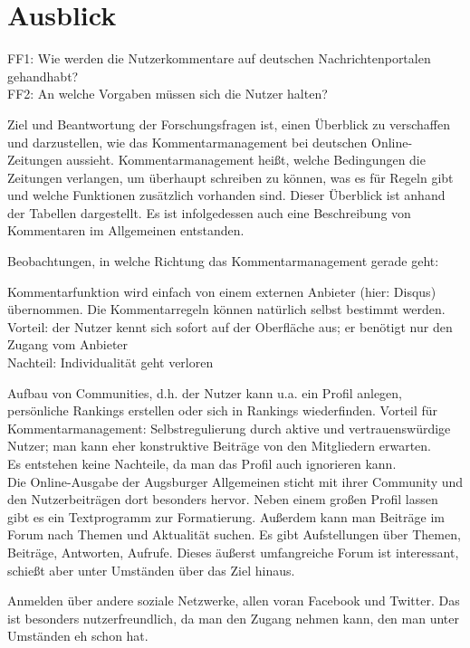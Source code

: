 \chapter{Ausblick}

FF1: Wie werden die Nutzerkommentare auf deutschen Nachrichtenportalen
gehandhabt?\\
FF2: An welche Vorgaben müssen sich die Nutzer halten?

Ziel und Beantwortung der Forschungsfragen ist, einen Überblick zu verschaffen und darzustellen, wie das Kommentarmanagement bei deutschen Online-Zeitungen aussieht. Kommentarmanagement heißt, welche Bedingungen die Zeitungen verlangen, um überhaupt schreiben zu können, was es für Regeln gibt und welche Funktionen zusätzlich vorhanden sind. Dieser Überblick ist anhand der Tabellen dargestellt. 
Es ist infolgedessen auch eine Beschreibung von Kommentaren im Allgemeinen entstanden.



Beobachtungen, in welche Richtung das Kommentarmanagement gerade geht:

Kommentarfunktion wird einfach von einem externen Anbieter (hier: Disqus) übernommen. Die Kommentarregeln können natürlich selbst bestimmt werden. \\
Vorteil: der Nutzer kennt sich sofort auf der Oberfläche aus; er benötigt nur den Zugang vom Anbieter\\
Nachteil: Individualität geht verloren


Aufbau von Communities, d.h. der Nutzer kann u.a. ein Profil anlegen, persönliche Rankings erstellen oder sich in Rankings wiederfinden.
Vorteil für Kommentarmanagement: Selbstregulierung durch aktive und vertrauenswürdige Nutzer; man kann eher konstruktive Beiträge von den Mitgliedern erwarten. \\
Es entstehen keine Nachteile, da man das Profil auch ignorieren kann.\\
Die Online-Ausgabe der Augsburger Allgemeinen sticht mit ihrer Community und den Nutzerbeiträgen dort besonders hervor. Neben einem großen Profil lassen gibt es ein Textprogramm zur Formatierung. Außerdem kann man Beiträge im Forum nach Themen und Aktualität suchen. Es gibt Aufstellungen über Themen, Beiträge, Antworten, Aufrufe. Dieses äußerst umfangreiche Forum ist interessant, schießt aber unter Umständen über das Ziel hinaus. 
 

Anmelden über andere soziale Netzwerke, allen voran Facebook und Twitter. Das ist besonders nutzerfreundlich, da man den Zugang nehmen kann, den man unter Umständen eh schon hat. 




